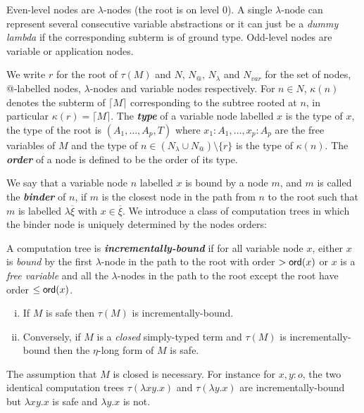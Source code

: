 \documentclass{llncs}
\newcommand\defname[1]{{\bf\em #1}\index{#1}}
\newcommand{\elnf}[1]{\lceil #1\rceil} %
\newcommand\ord[1]{{\sf
    ord}(#1)} \newcommand\typear{\rightarrow}
\newcommand\union{\cup}
\begin{document}
Even-level nodes are $\lambda$-nodes (the root is on level 0). A
single $\lambda$-node can represent several consecutive variable
abstractions or it can just be a \emph{dummy lambda} if the
corresponding subterm is of ground type.  Odd-level nodes are variable
or application nodes.

We write $r$ for the root of $\tau(M)$ and $N$, $N_@$, $N_\lambda$ and
$N_{var}$ for the set of nodes, @-labelled nodes, $\lambda$-nodes and
variable nodes respectively.  For $n \in N$, $\kappa(n)$ denotes the
subterm of $\elnf{M}$ corresponding to the subtree rooted at $n$, in
particular $\kappa(r) = \elnf{M}$.  The \defname{type} of a variable
node labelled $x$ is the type of $x$, the type of the root is
$(A_1,\ldots,A_p, T)$ where $x_1:A_1,\ldots, x_p:A_p$ are the free
variables of $M$ and the type of $n\in (N_\lambda \union N_@)
\setminus \{ r \}$ is the type of $\kappa(n)$. The \defname{order} of
a node is defined to be the order of its type.

We say that a variable node $n$ labelled $x$ is bound by a node $m$,
and $m$ is called the \defname{binder} of $n$, if $m$ is the closest
node in the path from $n$ to the root such that $m$ is labelled
$\lambda \overline{\xi}$ with $x\in \overline{\xi}$.
We introduce a class of computation trees in which the binder
node is uniquely determined by the nodes orders:
\begin{definition}\rm
  A computation tree is \defname{incrementally-bound} if for all
  variable node $x$, either $x$ is \emph{bound} by the first
  $\lambda$-node in the path to the root with order $> \ord{x}$ or $x$
  is a \emph{free variable} and all the $\lambda$-nodes in the path to
  the root except the root have order $\leq \ord{x}$.
\end{definition}

\begin{proposition} %
\label{prop:safe_imp_incrbound}
\begin{enumerate}[(i)]
\item If $M$ is safe then $\tau(M)$ is incrementally-bound.
\item Conversely, if $M$ is a \emph{closed} simply-typed term and $\tau(M)$
is incrementally-bound then the $\eta$-long form of $M$ is safe.
\end{enumerate}
\end{proposition}

The assumption that $M$ is closed is necessary. For instance for
$x,y:o$, the two identical computation trees $\tau(\lambda x y .x)$
and $\tau(\lambda y . x)$ are
incrementally-bound but $\lambda x y .x$ is safe and $\lambda y . x$
is not.
\end{document}
